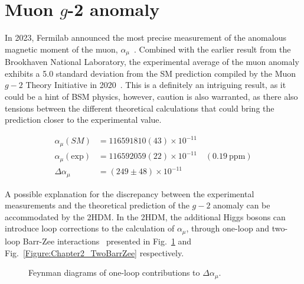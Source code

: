 \section{\texorpdfstring{Muon $g$-2 anomaly}{Muon g-2 anomaly}}

In 2023, Fermilab announced the most precise measurement of the anomalous magnetic moment of the muon, $\alpha_\mu$~\cite{Fermilab_g-2}. Combined with the earlier result from the Brookhaven National Laboratory, the experimental average of the muon anomaly exhibits a 5.0 standard deviation from the SM prediction compiled by the Muon $g-2$ Theory Initiative in 2020~\cite{Muon_Theory_Initiative}. This is a definitely an intriguing result, as it could be a hint of BSM physics, however, caution is also warranted, as there also tensions between the different theoretical calculations that could bring the prediction closer to the experimental value.


\begin{equation}
\begin{aligned}
    \alpha_\mu (SM) &= 116591810(43) \times 10^{-11} \\
    \alpha_\mu (\text{exp}) &= 116592059(22) \times 10^{-11} \quad (0.19~\text{ppm}) \\
    \Delta \alpha_\mu &= (249\pm48) \times 10^{-11}
\end{aligned}
\end{equation}

A possible explanation for the discrepancy between the experimental measurements and the theoretical prediction of the $g-2$ anomaly can be accommodated by the 2HDM. In the 2HDM, the additional Higgs bosons can introduce loop corrections to the calculation of $\alpha_\mu$, through one-loop and two-loop Barr-Zee interactions~\cite{Barr_Zee_1,Barr_Zee_2} presented in Fig.~\ref{Figure:Chapter2_OneBarrZee} and Fig.~\ref{Figure:Chapter2_TwoBarrZee} respectively. 

\begin{figure}[h]
    \centering
    \begin{subfigure}{0.45\textwidth}
        \centering
        
    \end{subfigure}
    \hfill
    \begin{subfigure}{0.45\textwidth}
        \centering
        \raisebox{8.2mm}{}
    \end{subfigure}

    \caption{Feynman diagrams of one-loop contributions to $\Delta\alpha_\mu$.}
    \label{Figure:Chapter2_OneBarrZee}
\end{figure}

